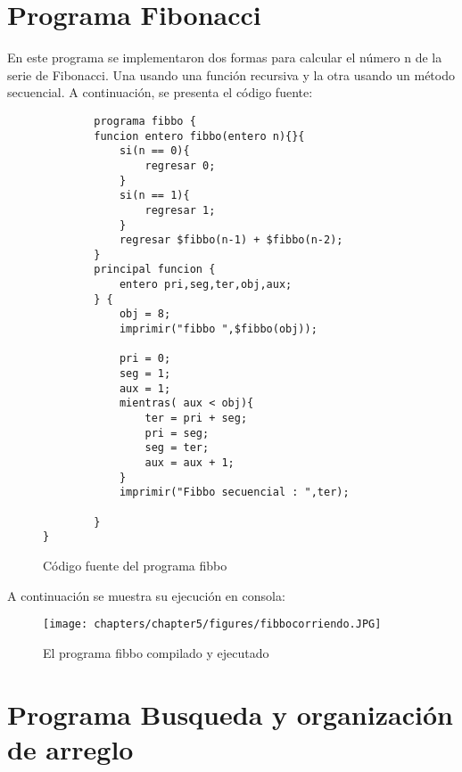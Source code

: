 \section{Programa Fibonacci}

En este programa se implementaron dos formas para calcular el número n de la serie de Fibonacci. Una usando una función recursiva y la otra usando un método secuencial.
A continuación, se presenta el código fuente:
\begin{figure}[htbp]
    \centering
    \begin{lstlisting}
        programa fibbo { 
    	funcion entero fibbo(entero n){}{
    		si(n == 0){
    			regresar 0;
    		}
    		si(n == 1){
    			regresar 1;
    		}
    		regresar $fibbo(n-1) + $fibbo(n-2);
    	}
    	principal funcion {
    		entero pri,seg,ter,obj,aux;
    	} {	
    		obj = 8;
    		imprimir("fibbo ",$fibbo(obj));
    
    		pri = 0;
    		seg = 1;
    		aux = 1;
    		mientras( aux < obj){
    			ter = pri + seg;
    			pri = seg;
    			seg = ter;
    			aux = aux + 1;
    		}
    		imprimir("Fibbo secuencial : ",ter);
    
    	} 
}

    \end{lstlisting}
    \caption{Código fuente del programa fibbo}
    \label{fig:my_label}
\end{figure}
\FloatBarrier

A continuación se muestra su ejecución en consola:
\begin{figure}[htbp]
    \centering
    \texttt{[image: chapters/chapter5/figures/fibbocorriendo.JPG]}
    \caption{El programa fibbo compilado y ejecutado}
    \label{fig:my_label}
\end{figure}
\FloatBarrier


\section{Programa Busqueda y organización de arreglo}

